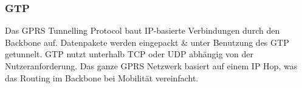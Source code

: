 \subsubsection{GTP}
Das GPRS Tunnelling Protocol baut IP-basierte Verbindungen durch den Backbone auf. Datenpakete werden eingepackt \& unter Benutzung des GTP getunnelt. GTP nutzt unterhalb TCP oder UDP  abhängig von der Nutzeranforderung. Das ganze GPRS Netzwerk basiert auf einem IP Hop, was das Routing im Backbone bei Mobilität vereinfacht.
